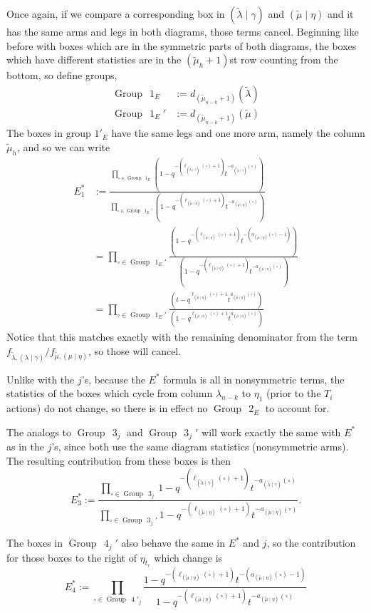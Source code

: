 \documentclass[ALCO]{cedram}
\newcommand{\nudom}{{( \lambda \mid \gamma )}}
\newcommand{\lambdagamma}{{\nudom}}
\newcommand{\mueta}{{(\mu \mid \eta)}}
\newcommand{\mutilde}{{\widetilde{\mu}}}
\newcommand{\lambdatilde}{{\widetilde{\lambda}}}
\newcommand{\lambdatildegamma}{{(\lambdatilde \mid \gamma)}}
\newcommand{\flambdatilde}{f_{\lambdatilde , \lambdagamma}}
\newcommand{\mutildeeta}{{(\mutilde \mid \eta)}}
\newcommand{\fmutilde}{f_{\mutilde, \mueta}}
\newcommand{\leg}[1]{{\ell_{#1}(\square)}}
\newcommand{\armtwo}[1]{{a_{#1}(\square)}}
\newcommand{\group}[1]{\operatorname{Group}\,\operatorname{#1}}
\newcommand{\Estarone}{E^*_1}
\newcommand{\Estarthree}{E^*_3}
\newcommand{\Estarfour}{E^*_4}
\begin{document}
Once again, if we compare a corresponding box in $\lambdatildegamma$ and $\mutildeeta$ and it has the same arms and legs in both diagrams, those terms cancel. Beginning like before with boxes which are in the symmetric parts of both diagrams, the boxes which have different statistics are in the $(\mutilde_{h}+1)$st row counting from the bottom, so define groups,
\begin{align*}
    \group{1}_E &:= d_{(\mutilde_{n-k}+1)}(\lambdatilde)\\
    \group{1}_E' &:= d_{(\mutilde_{n-k}+1)}(\mutilde)
\end{align*}
The boxes in group $1'_E$ have the same legs and one more arm, namely the column $\mutilde_h$, and so we can write
\begin{align*} \Estarone &:= \frac{ \prod\limits_{\square \in \group{1}_E} \left(1-q^{-(\ell_\lambdatildegamma(\square)+1)} t^{-a_\lambdatildegamma(\square)}\right)}{ \prod\limits_{\square \in \group{1}_E'} \left(1-q^{-(\ell_\mutildeeta(\square)+1)} t^{-a_\mutildeeta(\square)}\right)}\\
&= \prod\limits_{\square \in \group{1}_E'}\frac{ \left(1-q^{-(\ell_\mutildeeta(\square)+1)} t^{-(a_\mutildeeta(\square)-1)}\right)}{  \left(1-q^{-(\ell_\mutildeeta(\square)+1)} t^{-a_\mutildeeta(\square)}\right)}\\
&=  \prod\limits_{\square \in \group{1}_E'}\frac{ \left(t-q^{\ell_\mutildeeta(\square)+1} t^{a_\mutildeeta(\square)}\right)}{  \left(1-q^{\ell_\mutildeeta(\square)+1} t^{a_\mutildeeta(\square)}\right)}\end{align*}
Notice that this matches exactly with the remaining denominator from the term $\flambdatilde/\fmutilde$, so those will cancel.

Unlike with the $j$'s, because the $E^*$ formula is all in nonsymmetric terms, the statistics of the boxes which cycle from column $\lambda_{n-k}$ to $\eta_1$ (prior to the $T_i$ actions) do not change, so there is in effect no $\group{2}_E$ to account for.

The analogs to $\group{3}_j$ and $\group{3}_j'$ will work exactly the same with $E^*$ as in the $j$'s, since both use the same diagram statistics (nonsymmetric arms). The resulting contribution from these boxes is then
\[\Estarthree := \frac{\prod\limits_{\square \in \group{3}_j}1-q^{-(\leg{\lambdatildegamma}+1)}t^{-\armtwo{\lambdatildegamma}} }{\prod\limits_{\square \in \group{3}_j'} 1-q^{-(\leg{\mutildeeta}+1)}t^{-\armtwo{\mutildeeta}}}.\]

The boxes in $\group{4}_j'$ also behave the same in $E^*$ and $j$, so the contribution for those boxes to the right of $\eta_{t_r}$ which change is
\[ \Estarfour := \prod_{\square \in \group{4}'_j} \frac{1-q^{-(\leg{\mutildeeta}+1)}t^{-(\armtwo{\mutildeeta}-1)}}{1-q^{-(\leg{\mutildeeta}+1)}t^{-\armtwo{\mutildeeta}}}\]
\end{document}
